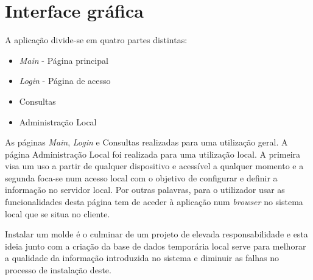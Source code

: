 \documentclass[11pt,twoside,a4paper]{report}
\begin{document}
\section{Interface gráfica}
A aplicação divide-se em quatro partes distintas:
\begin{itemize}[noitemsep]
	\item \textit{Main} - Página principal
	\item \textit{Login} - Página de acesso
	\item Consultas
	\item Administração Local
\end{itemize}
As páginas \textit{Main}, \textit{Login} e Consultas realizadas para uma utilização geral. A página Administração Local foi realizada para uma utilização local. A primeira visa um uso a partir de qualquer dispositivo e acessível a qualquer momento e a segunda foca-se num acesso local com o objetivo de configurar e definir a informação no servidor local. Por outras palavras, para o utilizador usar as funcionalidades desta página tem de aceder à aplicação num \textit{browser} no sistema local que se situa no cliente.\par 
Instalar um molde é o culminar de um projeto de elevada responsabilidade e esta ideia junto com a criação da base de dados temporária local serve para melhorar a qualidade da informação introduzida no sistema e diminuir as falhas no processo de instalação deste.

\newpage
\end{document}
